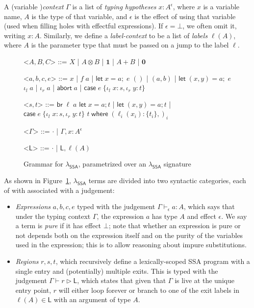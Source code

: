 \documentclass[acmsmall,screen,review]{acmart}
\newcommand{\ms}[1]{\ensuremath{\mathsf{#1}}}
\newcommand{\lto}{:}
\newcommand{\linl}[1]{\iota_l\;{#1}}
\newcommand{\linr}[1]{\iota_r\;{#1}}
\newcommand{\labort}[1]{\ms{abort}\;{#1}}
\newcommand{\letexpr}[3]{\ensuremath{\ms{let}\;#1 = #2;\;#3}}
\newcommand{\caseexpr}[5]{\ms{case}\;#1\;\{\linl{#2} \lto #3, \linr{#4} \lto #5\}}
\newcommand{\letstmt}[3]{\ensuremath{\ms{let}\;#1 = #2; #3}}
\newcommand{\brb}[2]{\ms{br}\;#1\;#2}
\newcommand{\casestmt}[5]{\ms{case}\;#1\;\{\linl{#2} \lto #3, \linr{#4} \lto #5\}}
\newcommand{\where}[2]{#1\;\ms{where}\;#2}
\newcommand{\wbranch}[3]{#1(#2) \lto \{#3\}}
\newcommand{\thyp}[3]{#1 : {#2}^{#3}}
\newcommand{\bhyp}[2]{#1 : #2}
\newcommand{\lhyp}[2]{#1(#2)}
\newcommand{\hasty}[4]{#1 \vdash_{#2} #3: {#4}}
\newcommand{\haslb}[3]{#1 \vdash #2 \rhd #3}
\newcommand{\isotopessa}{\(\lambda_{\ms{SSA}}\)}
\begin{document}
A (variable )\textit{context} $\Gamma$ is a list of \textit{typing hypotheses}
$\thyp{x}{A}{\epsilon}$, where $x$ is a variable name, $A$ is the type of that variable, and
$\epsilon$ is the effect of using that variable (used when filling holes with effectful
expressions). If $\epsilon = \bot$, we often omit it, writing $\bhyp{x}{A}$. Similarly, we define a
\textit{label-context} to be a list of \textit{labels} $\lhyp{\ell}{A}$, where $A$ is the parameter
type that must be passed on a jump to the label $\ell$.

\begin{figure}[H]
  \begin{center}
    \begin{grammar}
      <\(A, B, C\)> ::= 
      \(X\)
      \;|\; \(A \otimes B\)
      \;|\; \(\mathbf{1}\)
      \;|\; \(A + B\)
      \;|\; \(\mathbf{0}\)

      <\(a, b, c, e\)> ::= \(x\) 
      \;|\;  \(f\;a\)
      \;|\; \(\letexpr{x}{a}{e}\)
      \alt  \(()\)
      \;|\; \((a, b)\)
      \;|\; \(\letexpr{(x, y)}{a}{e}\)
      \alt  \(\linl{a}\) 
      \;|\; \(\linr{a}\)
      \;|\; \(\labort{a}\)
      \;|\; \(\caseexpr{e}{x}{s}{y}{t}\)
      
      <\(s, t\)> ::= \(\brb{\ell}{a}\) 
      \alt  \(\letstmt{x}{a}{t}\)
      \;|\; \(\letstmt{(x, y)}{a}{t}\)
      \;|\; \(\casestmt{e}{x}{s}{y}{t}\)
      \alt  \(\where{t}{(\wbranch{\ell_i}{x_i}{t_i},)_i}\)

      <\(\Gamma\)> ::= \(\cdot\) \;|\; \(\Gamma, \thyp{x}{A}{\epsilon}\)

      <\(\ms{L}\)> ::= \(\cdot\) \;|\; \(\ms{L}, \lhyp{\ell}{A}\)
    \end{grammar}
  \end{center}
  \caption{Grammar for \isotopessa{}, parametrized over an \isotopessa{} signature}
  \Description{}
  \label{fig:ssa-grammar}
\end{figure}

As shown in Figure~\ref{fig:ssa-grammar}, \isotopessa{} terms are divided into two syntactic
categories, each of with associated with a judgement:
\begin{itemize}
  \item \emph{Expressions} $a, b, c, e$ typed with the judgement $\hasty{\Gamma}{\epsilon}{a}{A}$,
  which says that under the typing context $\Gamma$, the expression $a$ has type $A$ and effect
  $\epsilon$. We say a term is \emph{pure} if it has effect $\bot$; note that whether an expression
  is pure or not depends both on the expression itself and on the purity of the variables used in
  the expression; this is to allow reasoning about impure substitutions.
  \item \emph{Regions} $r, s, t$, which recursively define a lexically-scoped SSA program with a
  single entry and (potentially) multiple exits. This is typed with the judgement
  $\haslb{\Gamma}{r}{\ms{L}}$, which states that given that $\Gamma$ is live at the unique entry
  point, $r$ will either loop forever or branch to one of the exit labels in $\ell(A) \in \ms{L}$
  with an argument of type $A$.
\end{itemize}
\end{document}

